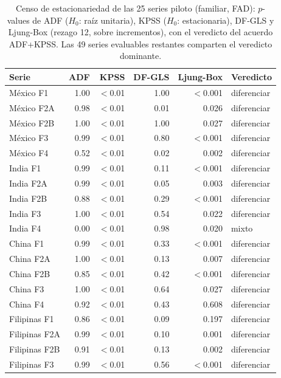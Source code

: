 \documentclass[12pt,letterpaper]{report}
\begin{document}
\begin{table}[htbp]
\centering
\footnotesize
\caption[Censo de estacionariedad del piloto]{Censo de estacionariedad de las 25 series
piloto (familiar, FAD): $p$-values de ADF ($H_0$: raíz unitaria), KPSS ($H_0$:
estacionaria), DF-GLS y Ljung-Box (rezago 12, sobre incrementos), con el veredicto del
acuerdo ADF+KPSS. Las 49 series evaluables restantes comparten el veredicto dominante.}
\label{tab:eda_estacionariedad}
\begin{tabular}{lrrrrl}
\toprule
\rowcolor{uacjblue!15}
\textbf{Serie} & \textbf{ADF} & \textbf{KPSS} & \textbf{DF-GLS} & \textbf{Ljung-Box} &
\textbf{Veredicto} \\
\midrule
México F1 & 1.00 & $<$0.01 & 1.00 & $<$0.001 & diferenciar \\
México F2A & 0.98 & $<$0.01 & 0.01 & 0.026 & diferenciar \\
México F2B & 1.00 & $<$0.01 & 1.00 & 0.027 & diferenciar \\
México F3 & 0.99 & $<$0.01 & 0.80 & $<$0.001 & diferenciar \\
México F4 & 0.52 & $<$0.01 & 0.02 & 0.002 & diferenciar \\
India F1 & 0.99 & $<$0.01 & 0.11 & $<$0.001 & diferenciar \\
India F2A & 0.99 & $<$0.01 & 0.05 & 0.003 & diferenciar \\
India F2B & 0.88 & $<$0.01 & 0.29 & $<$0.001 & diferenciar \\
India F3 & 1.00 & $<$0.01 & 0.54 & 0.022 & diferenciar \\
India F4 & 0.00 & $<$0.01 & 0.98 & 0.020 & mixto \\
China F1 & 0.99 & $<$0.01 & 0.33 & $<$0.001 & diferenciar \\
China F2A & 1.00 & $<$0.01 & 0.13 & 0.007 & diferenciar \\
China F2B & 0.85 & $<$0.01 & 0.42 & $<$0.001 & diferenciar \\
China F3 & 1.00 & $<$0.01 & 0.64 & 0.027 & diferenciar \\
China F4 & 0.92 & $<$0.01 & 0.43 & 0.608 & diferenciar \\
Filipinas F1 & 0.86 & $<$0.01 & 0.09 & 0.197 & diferenciar \\
Filipinas F2A & 0.99 & $<$0.01 & 0.10 & 0.001 & diferenciar \\
Filipinas F2B & 0.91 & $<$0.01 & 0.13 & 0.002 & diferenciar \\
Filipinas F3 & 0.99 & $<$0.01 & 0.56 & $<$0.001 & diferenciar \\

\end{tabular}
\end{table}
\end{document}
